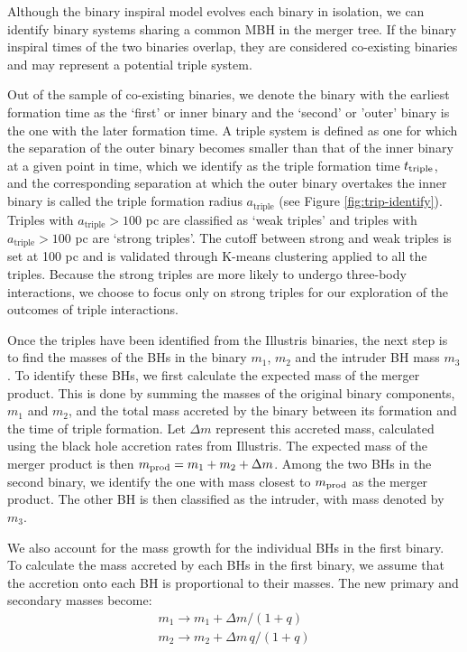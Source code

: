 \documentclass[11pt, letterpaper]{article}
\begin{document}
Although the binary inspiral model evolves each binary in isolation, we can identify binary systems sharing a common MBH in the merger tree. If the binary inspiral times of the two binaries overlap, they are considered co-existing binaries and may represent a potential triple system. 

Out of the sample of co-existing binaries, we denote the binary with the earliest formation time as the `first' or inner binary and the `second' or 'outer' binary is the one with the later formation time. A triple system is defined as one for which the separation of the outer binary becomes smaller than that of the inner binary at a given point in time, which we identify as the triple formation time
$t_{\rm triple}$, and the corresponding separation at which the outer binary overtakes the inner binary is called the triple formation radius $a_{\text{triple}}$ (see Figure \ref{fig:trip-identify}). Triples with $a_{\text{triple}} > 100$ pc are classified as `weak triples' and triples with $a_{\text{triple}} > 100$ pc are `strong triples'. The cutoff between strong and weak triples is set at 100 pc and is validated through K-means clustering applied to all the triples.
Because the strong triples are more likely to undergo three-body interactions, we choose to focus only on strong triples for our exploration of the outcomes of triple interactions. 


Once the triples have been identified from the Illustris binaries, the next step is to find the masses of the BHs in the binary $m_1$, $m_2$ and the intruder BH mass $m_3$. To identify these BHs, we first calculate the expected mass of the merger product. This is done by summing the masses of the original binary components, $m_1$ and $m_2$, and the total mass accreted by the binary between its formation and the time of triple formation. Let $\Delta m$ represent this accreted mass, calculated using the black hole accretion rates from Illustris. The expected mass of the merger product is then $m_{\rm prod} = m_1 + m_2 + \Delta m$. Among the two BHs in the second binary, we identify the one with mass closest to $m_{\rm prod}$ as the merger product. The other BH is then classified as the intruder, with mass denoted by $m_3$.

We also account for the mass growth for the individual BHs in the first binary. To calculate the mass accreted by each BHs in the first binary, we assume that the accretion onto each BH is proportional to their masses. The new primary and secondary masses become:
\begin{eqnarray}
    \label{eq: m1m2 accreted mass}
    m_{1} \rightarrow m_{1} +  \Delta m/(1+q)\\
    m_{2} \rightarrow  m_{2} +  \Delta m  \, q / (1+q)
\end{eqnarray}
\end{document}
